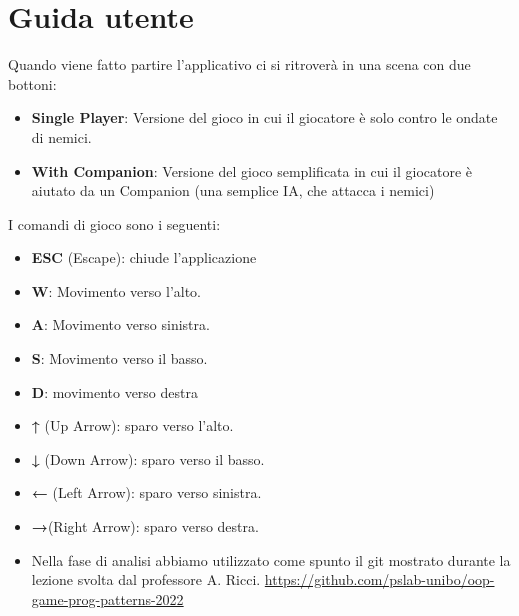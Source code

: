 \documentclass[a4paper,12pt]{report}
\begin{document}
\appendix
\chapter{Guida utente}

Quando viene fatto partire l'applicativo ci si ritroverà in una scena con due bottoni:
\begin{itemize}
    \item \textbf{Single Player}: Versione del gioco in cui il giocatore è solo contro le ondate di nemici.
    \item \textbf{With Companion}: Versione del gioco semplificata in cui il giocatore è aiutato da un Companion (una semplice IA, che attacca i nemici) 
\end{itemize}

I comandi di gioco sono i seguenti:
\begin{itemize}
    \item \textbf{ESC} (Escape): chiude l'applicazione
    \item \textbf{W}: Movimento verso l'alto.
    \item \textbf{A}: Movimento verso sinistra.
    \item \textbf{S}: Movimento verso il basso.
    \item \textbf{D}: movimento verso destra
    \item \textbf{↑} (Up Arrow): sparo verso l'alto.
    \item \textbf{↓} (Down Arrow): sparo verso il basso.
    \item \textbf{←} (Left Arrow): sparo verso sinistra.
    \item \textbf{→}(Right Arrow): sparo verso destra.
\end{itemize}



\begin{itemize}
	\item Nella fase di analisi abbiamo utilizzato come spunto il git mostrato durante la lezione svolta dal professore A. Ricci. \url{https://github.com/pslab-unibo/oop-game-prog-patterns-2022}
\end{itemize}
\end{document}
